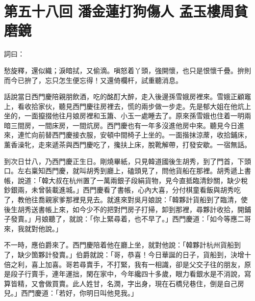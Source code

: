 
\chapter*{第五十八回 潘金蓮打狗傷人 孟玉樓周貧磨鏡}


詞曰：

\begin{myquote} 
愁旋釋，還似織；淚暗拭，又偷滴。嗔怒着丫頭，強開懷，也只是恨懷千疊。拚則而今已拚了，忘只怎生便忘得！又還倚欄杆，試重聽消息。

\end{myquote} 

話說當日西門慶陪親朋飲酒，吃的酩酊大醉，走入後邊孫雪娥房裡來。雪娥正顧竈上，看收拾家伙，聽見西門慶往房裡去，慌的兩步做一步走。{}先是郁大姐在他炕上坐的，一面攛掇他往月娘房裡和玉簫、小玉一處睡去了。原來孫雪娥也住着一明兩暗三間房，一間床房，一間炕房。西門慶也有一年多沒進他房中來。聽見今日進來，連忙向前替西門慶接衣服，安頓中間椅子上坐的。一面揩抹涼蓆，收拾鋪床，薰香澡牝，走來遞茶與西門慶吃了，攙扶上床，脫靴解帶，打發安歇。一宿無話。

到次日廿八，乃西門慶正生日。剛燒畢紙，只見韓道國後生胡秀，到了門首，下頭口。左右稟知西門慶，就叫胡秀到廳上，磕頭見了，問他貨船在那裡。胡秀遞上書帳，說道：「韓大叔在杭州置了一萬兩銀子段絹貨物，見今直抵臨清鈔關，缺少稅鈔銀兩，未曾裝載進城。」西門慶看了書帳，心內大喜，分付棋童看飯與胡秀吃了，教他往喬親家爹那裡見見去。就進來對吳月娘說：「韓夥計貨船到了臨清，使後生胡秀送書帳上來，如今少不的把對門房子打掃，卸到那裡，尋夥計收拾，開鋪子發賣。」月娘聽了，就說：「你上緊尋着，也不早了。」西門慶道：「如今等應二哥來，我就對他說。」

不一時，應伯爵來了。西門慶陪着他在廳上坐，就對他說：「韓夥計杭州貨船到了，缺少箇夥計發賣。」伯爵就說：「哥，恭喜！今日華誕的日子，貨船到，決增十倍之利，喜上加喜。{}哥若尋賣手，不打緊，我有一相識，卻是父交子往的朋友，原是段子行賣手，連年運拙，閑在家中，今年纔四十多歲，眼力看銀水是不消說，寫算皆精，又會做買賣。此人姓甘，名潤，字出身，現在石橋兒巷住，倒是自己房兒。」西門慶道：「若好，你明日叫他見我。」

